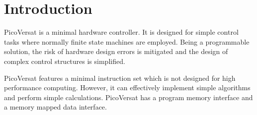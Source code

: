 \section{Introduction}

PicoVersat is a minimal hardware controller. It is designed for simple control
tasks where normally finite state machines are employed. Being a programmable
solution, the risk of hardware design errors is mitigated and the design of
complex control structures is simplified.

\noindent
PicoVersat features a minimal instruction set which is not designed for high
performance computing. However, it can effectively implement simple algorithms
and perform simple calculations. PicoVersat has a program memory interface and a
memory mapped data interface.

